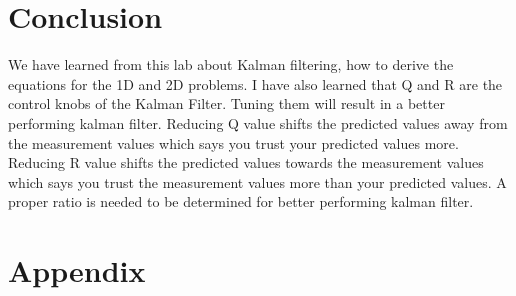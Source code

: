 \documentclass[12pt]{article}
\begin{document}
\section{Conclusion}
We have learned from this lab about Kalman filtering, how to derive the equations for the 1D and 2D problems. I have also learned that Q and R are the control knobs of the Kalman Filter. Tuning them will result in a better performing kalman filter. Reducing Q value shifts the predicted values away from the measurement values which says you trust your predicted values more. Reducing R value shifts the predicted values towards the measurement values which says you trust the measurement values more than your predicted values. A proper ratio is needed to be determined for better performing kalman filter. 
\section{Appendix}
\end{document}
